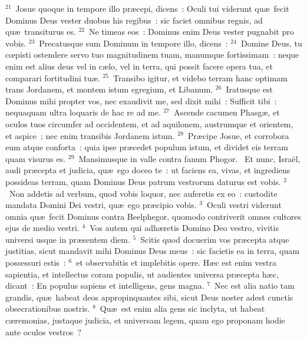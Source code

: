 ${}^{21}$~Josue quoque in tempore illo pr\ae cepi, dicens~: Oculi tui viderunt qu\ae\ fecit Dominus Deus vester duobus his regibus~: sic faciet omnibus regnis, ad qu\ae\ transiturus es.
${}^{22}$~Ne timeas eos~: Dominus enim Deus vester pugnabit pro vobis.
${}^{23}$~Precatusque sum Dominum in tempore illo, dicens~:
${}^{24}$~Domine Deus, tu cœpisti ostendere servo tuo magnitudinem tuam, manumque fortissimam~: neque enim est alius deus vel in c\ae lo, vel in terra, qui possit facere opera tua, et comparari fortitudini tu\ae .
${}^{25}$~Transibo igitur, et videbo terram hanc optimam trans Jordanem, et montem istum egregium, et Libanum.
${}^{26}$~Iratusque est Dominus mihi propter vos, nec exaudivit me, sed dixit mihi~: Sufficit tibi~: nequaquam ultra loquaris de hac re ad me.
${}^{27}$~Ascende cacumen Phasg\ae , et oculos tuos circumfer ad occidentem, et ad aquilonem, austrumque et orientem, et aspice~; nec enim transibis Jordanem istum.
${}^{28}$~Pr\ae cipe Josue, et corrobora eum atque conforta~: quia ipse pr\ae cedet populum istum, et dividet eis terram quam visurus es.
${}^{29}$~Mansimusque in valle contra fanum Phogor.
~\lettrine[lines=10,image=true,loversize=0.05,lraise=-0.03]{E}{}t nunc, Isra\"el, audi pr\ae cepta et judicia, qu\ae\ ego doceo te~: ut faciens ea, vivas, et ingrediens possideas terram, quam Dominus Deus patrum vestrorum daturus est vobis.
${}^{2}$~Non addetis ad verbum, quod vobis loquor, nec auferetis ex eo~: custodite mandata Domini Dei vestri, qu\ae\ ego pr\ae cipio vobis.
${}^{3}$~Oculi vestri viderunt omnia qu\ae\ fecit Dominus contra Beelphegor, quomodo contriverit omnes cultores ejus de medio vestri.
${}^{4}$~Vos autem qui adh\ae retis Domino Deo vestro, vivitis universi usque in pr\ae sentem diem.
${}^{5}$~Scitis quod docuerim vos pr\ae cepta atque justitias, sicut mandavit mihi Dominus Deus meus~: sic facietis ea in terra, quam possessuri estis~:
${}^{6}$~et observabitis et implebitis opere. H\ae c est enim vestra sapientia, et intellectus coram populis, ut audientes universa pr\ae cepta h\ae c, dicant~: En populus sapiens et intelligens, gens magna.
${}^{7}$~Nec est alia natio tam grandis, qu\ae\ habeat deos appropinquantes sibi, sicut Deus noster adest cunctis obsecrationibus nostris.
${}^{8}$~Qu\ae\ est enim alia gens sic inclyta, ut habeat c\ae remonias, justaque judicia, et universam legem, quam ego proponam hodie ante oculos vestros~?


